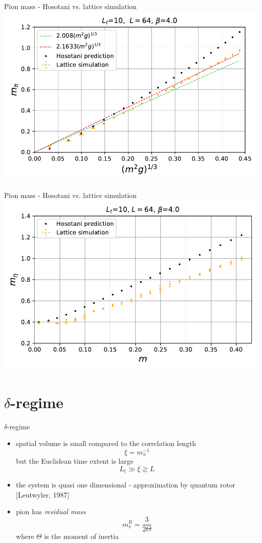 \documentclass[english]{beamer}
\begin{document}
\begin{frame}{Pion mass - Hosotani vs. lattice simulation}
  \includegraphics[width=1\textwidth]{figs/MPi64x10FiniteT}
\end{frame}

\begin{frame}{Pion mass - Hosotani vs. lattice simulation}
  \includegraphics[width=1\textwidth]{figs/Meta64x10FiniteT}
\end{frame}

\section{$\delta$-regime}

\begin{frame}{$\delta$-regime}
  \begin{itemize}
    \item spatial volume is small compared to the correlation
      length
      \[
        \xi = m_\pi^{-1}
      \]
      but the Euclidean time extent is large
      \[
        L_t\gg \xi \gtrsim L
      \]
    \item the system is quasi one dimensional - approximation by
      quantum rotor [Leutwyler, 1987]
    \item pion has \textit{residual mass}
      \[
        m_\pi^R = \frac{3}{2\Theta}
      \]
      where $\Theta$ is the moment of inertia
  \end{itemize}
\end{frame}
\end{document}
